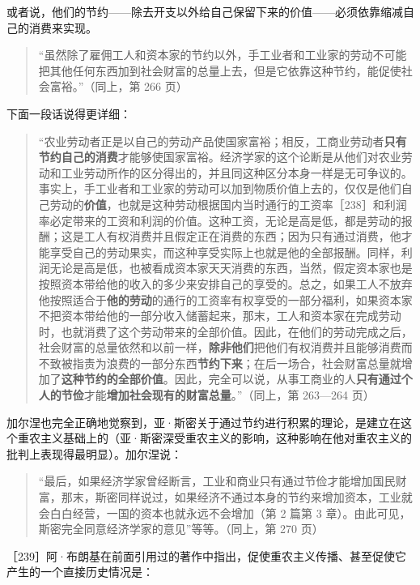或者说，他们的节约——除去开支以外给自己保留下来的价值——必须依靠缩减自己的消费来实现。

\begin{quote}“虽然除了雇佣工人和资本家的节约以外，手工业者和工业家的劳动不可能把其他任何东西加到社会财富的总量上去，但是它依靠这种节约，能促使社会富裕。”（同上，第 266 页）\end{quote}

下面一段话说得更详细：

\begin{quote}“农业劳动者正是以自己的劳动产品使国家富裕；相反，工商业劳动者\textbf{只有节约自己的消费}才能够使国家富裕。经济学家的这个论断是从他们对农业劳动和工业劳动所作的区分得出的，并且同这种区分本身一样是无可争议的。事实上，手工业者和工业家的劳动可以加到物质价值上去的，仅仅是他们自己劳动的\textbf{价值}，也就是这种劳动根据国内当时通行的工资率［238］和利润率必定带来的工资和利润的价值。这种工资，无论是高是低，都是劳动的报酬；这是工人有权消费并且假定正在消费的东西；因为只有通过消费，他才能享受自己的劳动果实，而这种享受实际上也就是他的全部报酬。同样，利润无论是高是低，也被看成资本家天天消费的东西，当然，假定资本家也是按照资本带给他的收入的多少来安排自己的享受的。总之，如果工人不放弃他按照适合于\textbf{他的劳动}的通行的工资率有权享受的一部分福利，如果资本家不把资本带给他的一部分收入储蓄起来，那末，工人和资本家在完成劳动时，也就消费了这个劳动带来的全部价值。因此，在他们的劳动完成之后，社会财富的总量依然和以前一样，\textbf{除非他们}把他们有权消费并且能够消费而不致被指责为浪费的一部分东西\textbf{节约下来}；在后一场合，社会财富总量就增加了\textbf{这种节约的全部价值}。因此，完全可以说，从事工商业的人\textbf{只有通过个人的节俭}才能\textbf{增加社会现有的财富总量}。”（同上，第 263—264 页）\end{quote}

加尔涅也完全正确地觉察到，亚·斯密关于通过节约进行积累的理论，是建立在这个重农主义基础上的（亚·斯密深受重农主义的影响，这种影响在他对重农主义的批判上表现得最明显）。加尔涅说：

\begin{quote}“最后，如果经济学家曾经断言，工业和商业只有通过节俭才能增加国民财富，那末，斯密同样说过，如果经济不通过本身的节约来增加资本，工业就会白白经营，一国的资本也就永远不会增加（第 2 篇第 3 章）。由此可见，斯密完全同意经济学家的意见”等等。（同上，第 270 页）\end{quote}


［239］阿·布朗基在前面引用过的著作中指出，促使重农主义传播、甚至促使它产生的一个直接历史情况是：

